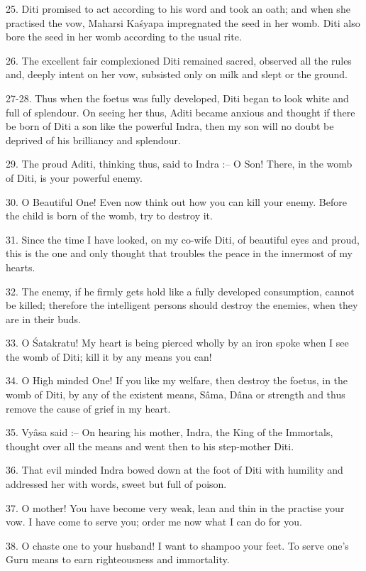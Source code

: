 25. Diti promised to act according to his word and took an oath; and when she practised the vow, Maharsi Ka\'syapa impregnated the seed in her womb. Diti also bore the seed in her womb according to the usual rite.

26. The excellent fair complexioned Diti remained sacred, observed all the rules and, deeply intent on her vow, subsisted only on milk and slept or the ground.

27-28. Thus when the foetus was fully developed, Diti began to look white and full of splendour. On seeing her thus, Aditi became anxious and thought if there be born of Diti a son like the powerful Indra, then my son will no doubt be deprived of his brilliancy and splendour.

29. The proud Aditi, thinking thus, said to Indra :-- O Son! There, in the womb of Diti, is your powerful enemy.

30. O Beautiful One! Even now think out how you can kill your enemy. Before the child is born of the womb, try to destroy it.

31. Since the time I have looked, on my co-wife Diti, of beautiful eyes and proud, this is the one and only thought that troubles the peace in the innermost of my hearts.

32. The enemy, if he firmly gets hold like a fully developed consumption, cannot be killed; therefore the intelligent persons should destroy the enemies, when they are in their buds.

33. O \'Satakratu! My heart is being pierced wholly by an iron spoke when I see the womb of Diti; kill it by any means you can!

34. O High minded One! If you like my welfare, then destroy the foetus, in the womb of Diti, by any of the existent means, S\^ama, D\^ana or strength and thus remove the cause of grief in my heart.

35. Vy\^asa said :-- On hearing his mother, Indra, the King of the Immortals, thought over all the means and went then to his step-mother Diti.

36. That evil minded Indra bowed down at the foot of Diti with humility and addressed her with words, sweet but full of poison.

37. O mother! You have become very weak, lean and thin in the practise your vow. I have come to serve you; order me now what I can do for you.

38. O chaste one to your husband! I want to shampoo your feet. To serve one's Guru means to earn righteousness and immortality.

